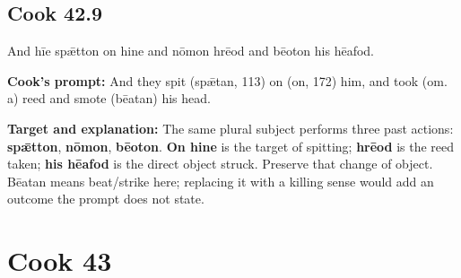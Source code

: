 \par\begin{minipage}{\linewidth}\raggedright
\subsection*{Cook 42.9}

And hīe spǣtton on hine and nōmon hrēod and bēoton his hēafod.

\textbf{Cook's prompt:} And they spit (spǣtan, 113) on (on, 172) him, and took (om. a) reed and smote (bēatan) his head.

\textbf{Target and explanation:} The same plural subject performs three past actions: \textbf{spǣtton}, \textbf{nōmon}, \textbf{bēoton}. \textbf{On hine} is the target of spitting; \textbf{hrēod} is the reed taken; \textbf{his hēafod} is the direct object struck. Preserve that change of object. Bēatan means beat/\allowbreak{}strike here; replacing it with a killing sense would add an outcome the prompt does not state.

\end{minipage}\par\addvspace{4pt}

\clearpage
\section*{Cook 43}

